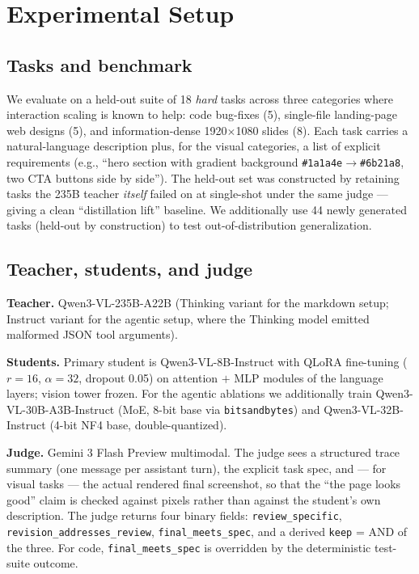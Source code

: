 \documentclass[11pt]{article}
\begin{document}
\section{Experimental Setup}
\label{sec:setup}

\subsection{Tasks and benchmark}

We evaluate on a held-out suite of 18 \emph{hard} tasks across three categories where interaction scaling is known to help: code bug-fixes (5), single-file landing-page web designs (5), and information-dense 1920$\times$1080 slides (8). Each task carries a natural-language description plus, for the visual categories, a list of explicit requirements (e.g., ``hero section with gradient background \texttt{\#1a1a4e}$\to$\texttt{\#6b21a8}, two CTA buttons side by side''). The held-out set was constructed by retaining tasks the 235B teacher \emph{itself} failed on at single-shot under the same judge --- giving a clean ``distillation lift'' baseline. We additionally use 44 newly generated tasks (held-out by construction) to test out-of-distribution generalization.

\subsection{Teacher, students, and judge}

\textbf{Teacher.} Qwen3-VL-235B-A22B (Thinking variant for the markdown setup; Instruct variant for the agentic setup, where the Thinking model emitted malformed JSON tool arguments).

\textbf{Students.} Primary student is Qwen3-VL-8B-Instruct with QLoRA fine-tuning ($r{=}16$, $\alpha{=}32$, dropout 0.05) on attention $+$ MLP modules of the language layers; vision tower frozen. For the agentic ablations we additionally train Qwen3-VL-30B-A3B-Instruct (MoE, 8-bit base via \texttt{bitsandbytes}) and Qwen3-VL-32B-Instruct (4-bit NF4 base, double-quantized).

\textbf{Judge.} Gemini 3 Flash Preview multimodal. The judge sees a structured trace summary (one message per assistant turn), the explicit task spec, and --- for visual tasks --- the actual rendered final screenshot, so that the ``the page looks good'' claim is checked against pixels rather than against the student's own description. The judge returns four binary fields: \texttt{review\_specific}, \texttt{revision\_addresses\_review}, \texttt{final\_meets\_spec}, and a derived \texttt{keep} = AND of the three. For code, \texttt{final\_meets\_spec} is overridden by the deterministic test-suite outcome.
\end{document}
